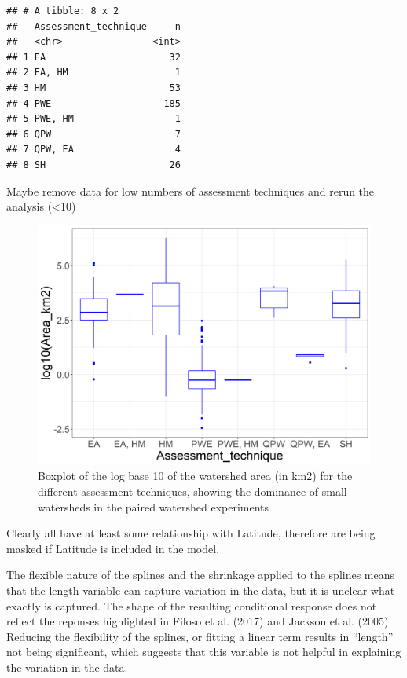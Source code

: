 \documentclass[]{elsarticle} %
\begin{document}
\begin{verbatim}
## # A tibble: 8 x 2
##   Assessment_technique     n
##   <chr>                <int>
## 1 EA                      32
## 2 EA, HM                   1
## 3 HM                      53
## 4 PWE                    185
## 5 PWE, HM                  1
## 6 QPW                      7
## 7 QPW, EA                  4
## 8 SH                      26
\end{verbatim}

Maybe remove data for low numbers of assessment techniques and rerun the
analysis (\textless10)

\begin{figure}
\includegraphics[width=0.9\linewidth]{AssessmentTechnique_byArea} \caption{Boxplot of the log base 10 of the watershed area (in km2) for the different assessment techniques, showing the dominance of small watersheds in the paired watershed experiments}\label{fig:assessment}
\end{figure}

Clearly all have at least some relationship with Latitude, therefore are
being masked if Latitude is included in the model.

The flexible nature of the splines and the shrinkage applied to the
splines means that the length variable can capture variation in the
data, but it is unclear what exactly is captured. The shape of the
resulting conditional response does not reflect the reponses highlighted
in Filoso et al. (2017) and Jackson et al. (2005). Reducing the
flexibility of the splines, or fitting a linear term results in
``length'' not being significant, which suggests that this variable is
not helpful in explaining the variation in the data.
\end{document}
